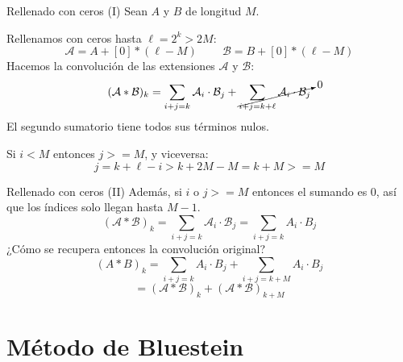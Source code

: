 \documentclass[spanish]{beamer}
\begin{document}
\begin{frame}{Rellenado con ceros (I)}\medskip
    Sean $A$ y $B$ de longitud $M$. 
    
    Rellenamos con ceros hasta $\ell = 2^k > 2M$: 
    \begin{equation*}
        \mathcal{A} = A + [0]*(\ell - M)\ \qquad 
        \mathcal{B} = B + [0]*(\ell - M)
    \end{equation*}
    Hacemos la convolución de las extensiones $\mathcal{A}$ y $\mathcal{B}$:
    \begin{equation*}
        (\mathcal{A}*\mathcal{B})_k = \sum_{i+j=k} \mathcal{A}_i \cdot \mathcal{B}_j + \cancelto{0}{\sum_{i+j=k+\ell} \mathcal{A}_i \cdot \mathcal{B}_j}
    \end{equation*}
    El segundo sumatorio tiene todos sus términos nulos. 
    
    Si $i<M$ entonces $j>=M$, y viceversa:
    \begin{equation*}
        j = k+\ell-i > k+2M-M= k + M >= M
    \end{equation*}
    
\end{frame}

\begin{frame}{Rellenado con ceros (II)}\medskip
    Además, si $i$ o $j >= M$ entonces el sumando es 0, así que los índices solo llegan hasta $M-1$.
    \begin{equation*}
        (\mathcal{A}*\mathcal{B})_k = \sum_{i+j=k} \mathcal{A}_i \cdot \mathcal{B}_j = \sum_{i+j=k} A_i \cdot B_j
    \end{equation*}
    ¿Cómo se recupera entonces la convolución original?
    \begin{equation*}
        (A*B)_k = \sum_{i+j=k} A_i\cdot B_j + \sum_{i+j=k+M} A_i\cdot B_j
    \end{equation*}
    \begin{equation*}
        = (\mathcal{A}*\mathcal{B})_k + (\mathcal{A}*\mathcal{B})_{k+M}
    \end{equation*}
    
\end{frame}


\section{Método de Bluestein}

\end{document}
